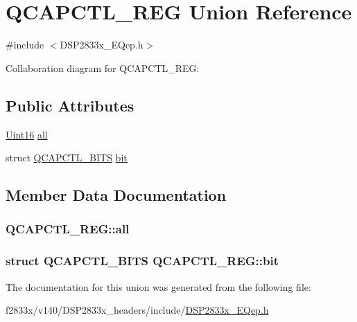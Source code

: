 \hypertarget{union_q_c_a_p_c_t_l___r_e_g}{}\section{Q\+C\+A\+P\+C\+T\+L\+\_\+\+R\+E\+G Union Reference}
\label{union_q_c_a_p_c_t_l___r_e_g}


{\ttfamily \#include $<$D\+S\+P2833x\+\_\+\+E\+Qep.\+h$>$}



Collaboration diagram for Q\+C\+A\+P\+C\+T\+L\+\_\+\+R\+E\+G\+:
\subsection*{Public Attributes}
\begin{DoxyCompactItemize}
\item 
\hyperlink{_d_s_p2833x___device_8h_a59a9f6be4562c327cbfb4f7e8e18f08b}{Uint16} \hyperlink{union_q_c_a_p_c_t_l___r_e_g_ab86b36d7457295c501dfb915190b62a9}{all}
\item 
struct \hyperlink{struct_q_c_a_p_c_t_l___b_i_t_s}{Q\+C\+A\+P\+C\+T\+L\+\_\+\+B\+I\+T\+S} \hyperlink{union_q_c_a_p_c_t_l___r_e_g_a3b1e807bdc0d92b7cd54d2ab50586f67}{bit}
\end{DoxyCompactItemize}


\subsection{Member Data Documentation}
\hypertarget{union_q_c_a_p_c_t_l___r_e_g_ab86b36d7457295c501dfb915190b62a9}{}
\subsubsection[{all}]{ Q\+C\+A\+P\+C\+T\+L\+\_\+\+R\+E\+G\+::all}\label{union_q_c_a_p_c_t_l___r_e_g_ab86b36d7457295c501dfb915190b62a9}
\hypertarget{union_q_c_a_p_c_t_l___r_e_g_a3b1e807bdc0d92b7cd54d2ab50586f67}{}
\subsubsection[{bit}]{\setlength{\rightskip}{0pt plus 5cm}struct {\bf Q\+C\+A\+P\+C\+T\+L\+\_\+\+B\+I\+T\+S} Q\+C\+A\+P\+C\+T\+L\+\_\+\+R\+E\+G\+::bit}\label{union_q_c_a_p_c_t_l___r_e_g_a3b1e807bdc0d92b7cd54d2ab50586f67}


The documentation for this union was generated from the following file\+:\begin{DoxyCompactItemize}
\item 
f2833x/v140/\+D\+S\+P2833x\+\_\+headers/include/\hyperlink{_d_s_p2833x___e_qep_8h}{D\+S\+P2833x\+\_\+\+E\+Qep.\+h}\end{DoxyCompactItemize}
